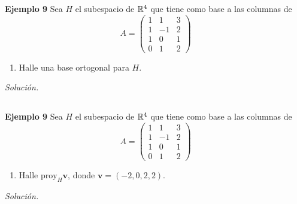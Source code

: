 \begin{frame}%
	
	\begin{ej}{\textbf{Ejemplo 9}}\justifying 
		Sea $H$ el subespacio de $\mathbb{R}^4$ que tiene como base a las columnas de  
		\[
		A = 
		\left(
		\begin{array}{rrr}
		1 & 1 & 3 \\[1mm]
		1 & -1 & 2 \\[1mm]
		1 & 0 & 1 \\[1mm]
		0 & 1 & 2 
		\end{array}
		\right)
		\]
		\begin{enumerate}
			\item[\labelname{$a$}] Halle una base ortogonal para $H$.
		\end{enumerate}
	\end{ej}
	\textit{Solución.}
	
\end{frame}


\subsection{}

\begin{frame}%
	
	\begin{ej}{\textbf{Ejemplo 9}}\justifying 
		Sea $H$ el subespacio de $\mathbb{R}^4$ que tiene como base a las columnas de  
		\[
		A = 
		\left(
		\begin{array}{rrr}
		1 & 1 & 3 \\[1mm]
		1 & -1 & 2 \\[1mm]
		1 & 0 & 1 \\[1mm]
		0 & 1 & 2 
		\end{array}
		\right)
		\]
		\begin{enumerate}
			\item[\labelname{$b$}] Halle $\text{proy}_H \mathbf{v}$, donde $\mathbf{v}=(-2,0,2,2)$.
		\end{enumerate}
	\end{ej}
	\textit{Solución.}
	
\end{frame}


